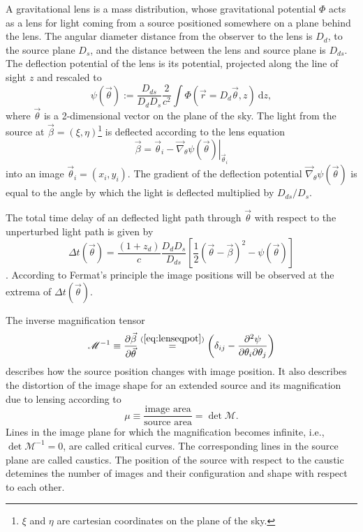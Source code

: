 \documentclass[useAMS,usenatbib]{mnras}
\newcommand{\vect}[1]{\vec{#1}} %
\begin{document}
A gravitational lens is a mass distribution, whose gravitational potential $\Phi$ acts as a lens for light coming from a source positioned somewhere on a plane behind the lens. The angular diameter distance from the observer to the lens is $D_d$, to the source plane $D_s$, and the distance between the lens and source plane is $D_{ds}$. The deflection potential of the lens is its potential, projected along the line of sight $z$ and rescaled to
\begin{equation}
\psi(\vect{\theta}) := \frac{D_{ds}}{D_d D_s} \frac{2}{c^2} \int \Phi(\vect{r}=D_d \vect{\theta},z) {\ \mathrm d} z, \label{eq:psidef}
\end{equation}
where $\vect{\theta}$ is a 2-dimensional vector on the plane of the sky. The light from the source at $\vect{\beta} = (\xi,\eta)$\footnote{$\xi$ and $\eta$ are cartesian coordinates on the plane of the sky.} is deflected according to the lens equation
\begin{equation}
\vect{\beta} = \vect{\theta}_i - \left.\vect{\nabla}_\theta \psi(\vect{\theta})\right|_{\vect{\theta}_i} \label{eq:lenseqpot}
\end{equation}
into an image $\vect{\theta}_i = (x_i,y_i)$. The gradient of the deflection potential $\vect{\nabla}_\theta \psi(\vect{\theta})$ is equal to the angle by which the light is deflected multiplied by $D_{ds}/D_{s}$.

The total time delay of an deflected light path through $\vect{\theta}$ with respect to the unperturbed light path is given by 
\begin{equation}
\Delta t(\vect{\theta}) = \frac{(1+z_d)}{c} \frac{D_d D_s}{D_{ds}} \left[ \frac 12 (\vect{\theta} - \vect{\beta})^2 - \psi(\vect{\theta})\right] \label{eq:timedelay}
\end{equation}
\citep{BartGravLens}. According to Fermat's principle the image positions will be observed at the extrema of $\Delta t(\vect{\theta})$.

The inverse magnification tensor
\begin{equation}
\mathscr{M}^{-1} \equiv \frac{\partial \vect{\beta}}{\partial \vect{\theta}} \overset{(\ref{eq:lenseqpot})}{=} \left(\delta_{ij} - \frac{\partial^2 \psi}{\partial \theta_i \partial \theta_j} \right)\label{eq:magnificationtensor}
\end{equation}
describes how the source position changes with image position. It also describes the distortion of the image shape for an extended source and its magnification due to lensing according to
$$\mu \equiv \frac{\text{image area}}{\text{source area}} = \det \mathscr{M}.$$
Lines in the image plane for which the magnification becomes infinite, i.e., $\det \mathscr{M}^{-1} = 0$, are called critical curves. The corresponding lines in the source plane are called caustics. The position of the source with respect to the caustic detemines the number of images and their configuration and shape with respect to each other.
\end{document}
